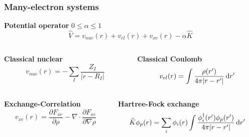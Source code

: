 \begin{frame}
    \frametitle{Many-electron systems}
    \centering
    \textbf{Potential operator} $0 \leq \alpha \leq 1$
    \begin{equation}
        \nonumber
        \hat{V} = v_{nuc}(r) + v_{el}(r) + v_{xc}(r) - \alpha\hat{K}
    \end{equation}

    \vspace{10mm}

    \begin{columns}
    \begin{column}[b]{0.5\textwidth}
    \centering
    \textbf{Classical nuclear}
    \begin{equation}
        \nonumber
	v_{nuc}(r) = -\sum_I\frac{Z_I}{|r-R_I|}
    \end{equation}
    \end{column}

    \begin{column}[b]{0.5\textwidth}
    \centering
    \textbf{Classical Coulomb}
    \begin{equation}
        \nonumber
        v_{el}(r) = \int \frac{\rho(r')}{4\pi|r-r'|} \,\mathrm{d} r'
    \end{equation}
    \end{column}
    \end{columns}

    \vspace{5mm}

    \begin{columns}
    \begin{column}[b]{0.5\textwidth}
    \centering
    \textbf{Exchange-Correlation}
    \begin{equation}
        \nonumber
        v_{xc}(r)
        = \frac{\partial F_{xc}}{\partial \rho} - \nabla \cdot \frac{\partial F_{xc}}{\partial \nabla\rho}
    \end{equation}
    \end{column}

    \begin{column}[b]{0.5\textwidth}
    \centering
    \textbf{Hartree-Fock exchange}
    \begin{equation}
        \nonumber
        \hat{K}\phi_p(r) = \sum_i \phi_i(r) \int \frac{\phi_i^\dagger(r')\phi_p(r')}{4\pi|r-r'|} \,\mathrm{d} r'
    \end{equation}
    \end{column}
    \end{columns}
\end{frame}

